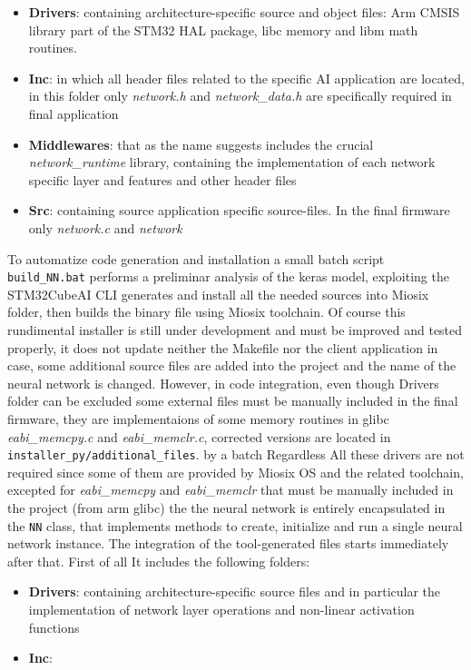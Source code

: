 \begin{itemize}
	\item \textbf{Drivers}: containing architecture-specific source and object files: Arm CMSIS library part of the STM32 HAL package, libc memory and libm math routines. 
	\item \textbf{Inc}: in which all header files related to the specific AI application are located, in this folder only \textit{network.h} and \textit{network\_data.h} are specifically required in final application
	\item \textbf{Middlewares}: that as the name suggests includes the crucial \textit{network\_runtime} library, containing the implementation of each network specific layer and features and other header files
	\item \textbf{Src}: containing source application specific source-files. In the final firmware only \textit{network.c} and \textit{network}
\end{itemize} 
To automatize code generation and installation a small batch script \texttt{build_NN.bat} performs a preliminar analysis of the keras model, exploiting the STM32CubeAI CLI generates and install all the needed sources into Miosix folder, then builds the binary file using Miosix toolchain. Of course this rundimental installer is still under development and must be improved and tested properly, it does not update neither the Makefile nor the client application in case, some additional source files are added into the project and the name of the neural network is changed. However, in code integration, even though Drivers folder can be excluded some external files must be manually included in the final firmware, they are implementaions of some memory routines in glibc \textit{eabi\_memcpy.c} and \textit{eabi\_memclr.c}, corrected versions are located in \texttt{installer_py/additional_files}.    by a batch  Regardless All these drivers are not required since some of them are provided by Miosix OS and the related toolchain, excepted for \textit{eabi\_memcpy} and \textit{eabi\_memclr} that must be manually included in the project (from arm glibc) the  the neural network is entirely encapsulated in the \texttt{NN} class, that implements methods to create, initialize and run a single neural network instance. The integration of the tool-generated files starts immediately after that. First of all It includes the following folders:

\begin{itemize}
	\item \textbf{Drivers}: containing architecture-specific source files and in particular the implementation of network layer operations and non-linear activation functions
	\item \textbf{Inc}:
\end{itemize} 



